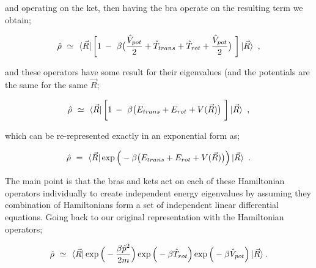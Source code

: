 \documentclass{article}
\begin{document}
and operating on the ket, then having the bra operate on the resulting term we obtain;

\begin{equation} \label{eq:1}
\hat{\rho} \hspace{0.125cm} \simeq \hspace{0.125cm} \bra{\vec{R}} \bigg[ 1 \hspace{0.075cm} - \hspace{0.125cm} \beta \big( \frac{\hat{V}_{pot}}{2} + \hat{T}_{trans} + \hat{T}_{rot} + \frac{\hat{V}_{pot}}{2} \big) \hspace{0.125cm} \bigg] \ket{\vec{R}} \hspace{0.125cm} ,
\end{equation}

and these operators have some result for their eigenvalues (and the potentials are the same for the same \begin{math} \vec{R} \end{math};

\begin{equation} \label{eq:1}
\hat{\rho} \hspace{0.125cm} \simeq \hspace{0.125cm} \bra{\vec{R}} \bigg[ 1 \hspace{0.075cm} - \hspace{0.125cm} \beta \big( E_{trans} + E_{rot} + V(\vec{R})\big) \hspace{0.125cm} \bigg] \ket{\vec{R}} \hspace{0.125cm} ,
\end{equation}

which can be re-represented exactly in an exponential form as;

\begin{equation} \label{eq:1}
\hat{\rho} \hspace{0.125cm} = \hspace{0.125cm} \bra{\vec{R}} \exp \Big( - \beta \big( E_{trans} + E_{rot} + V(\vec{R})\big) \Big) \ket{\vec{R}} \hspace{0.125cm} .
\end{equation}

The main point is that the bras and kets act on each of these Hamiltonian operators individually to create independent energy eigenvalues by assuming they combination of Hamiltonians form a set of independent linear differential equations. Going back to our original representation with the Hamiltonian operators;

\begin{equation} \label{eq:1}
\hat{\rho} \hspace{0.125cm} \simeq \hspace{0.125cm} \bra{\vec{R}} \exp \Big( - \frac{\beta \hat{p}^2}{2 m} \Big) \exp \Big( - \beta \hat{T}_{rot} \Big) \exp \Big( - \beta \hat{V}_{pot} \Big)  \ket{\vec{R}} \hspace{0.025cm} . \end{equation}
\end{document}

